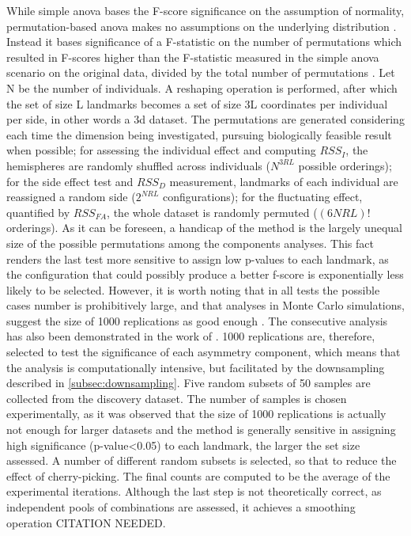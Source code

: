 While simple \ac{anova} bases the F-score significance on the assumption of normality, permutation-based \ac{anova} makes no assumptions on the underlying distribution \cite{Anderson2001}. Instead it bases significance of a F-statistic on the number of permutations which resulted in F-scores higher than the F-statistic measured in the simple \ac{anova} scenario on the original data, divided by the total number of permutations \cite{Klingenberg1998}. Let N be the number of individuals. A reshaping operation is performed, after which the set of size L landmarks becomes a set of size 3L coordinates per individual per side, in other words a \ac{3d} dataset. The permutations are generated considering each time the dimension being investigated, pursuing biologically feasible result when possible; for assessing the individual effect and computing $RSS_I$, the hemispheres are randomly shuffled across individuals  ($N^{3RL}$ possible orderings); for the side effect test and $RSS_{D}$ measurement, landmarks of each individual are reassigned a random side ($2^{NRL}$ configurations); for the fluctuating effect, quantified by $RSS_{FA}$, the whole dataset is randomly permuted ($(6NRL)!$ orderings). As it can be foreseen, a handicap of the method is the largely unequal size of the possible permutations among the components analyses. This fact renders the last test more sensitive to assign low p-values to each landmark, as the configuration that could possibly produce a better f-score is exponentially less likely to be selected. However, it is worth noting that in all tests the possible cases number is prohibitively large, and that analyses in Monte Carlo simulations, suggest the size of 1000 replications as good enough \cite{Marozzi2004}. The consecutive analysis has also been demonstrated in the work of \citet{Vanbiervliet2022}. 1000 replications are, therefore, selected to test the significance of each asymmetry component, which means that the analysis is computationally intensive, but facilitated by the downsampling described in \autoref{subsec:downsampling}. Five random subsets of 50 samples are collected from the discovery dataset. The number of samples is chosen experimentally, as it was observed that the size of 1000 replications is actually not enough for larger datasets and the method is generally sensitive in assigning high significance (p-value<0.05) to each landmark, the larger the set size assessed. A number of different random subsets is selected, so that to reduce the effect of cherry-picking. The final counts are computed to be the average of the experimental iterations. Although the last step is not theoretically correct, as independent pools of combinations are assessed, it achieves a smoothing operation CITATION NEEDED.


